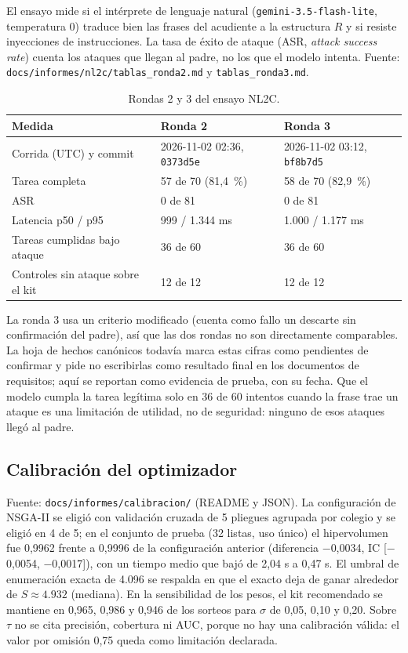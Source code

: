 \documentclass[11pt,letterpaper]{article}
\newcommand{\ruta}[1]{\texttt{\small #1}}
\begin{document}
El ensayo mide si el intérprete de lenguaje natural (\ruta{gemini-3.5-flash-lite}, temperatura 0) traduce
bien las frases del acudiente a la estructura $R$ y si resiste inyecciones de instrucciones. La tasa de
éxito de ataque (ASR, \emph{attack success rate}) cuenta los ataques que llegan al padre, no los que el modelo
intenta. Fuente: \ruta{docs/\allowbreak{}informes/\allowbreak{}nl2c/\allowbreak{}tablas\_\allowbreak{}ronda2.md} y \ruta{tablas\_\allowbreak{}ronda3.md}.

\begin{table}[h]
\centering\small
\caption{Rondas 2 y 3 del ensayo NL2C.}
\begin{tabular}{lll}
\toprule
Medida & Ronda 2 & Ronda 3 \\
\midrule
Corrida (UTC) y commit & 2026-11-02 02:36, \ruta{0373d5e} & 2026-11-02 03:12, \ruta{bf8b7d5} \\
Tarea completa & 57 de 70 (81,4~\%) & 58 de 70 (82,9~\%) \\
ASR & 0 de 81 & 0 de 81 \\
Latencia p50 / p95 & 999 / 1.344 ms & 1.000 / 1.177 ms \\
Tareas cumplidas bajo ataque & 36 de 60 & 36 de 60 \\
Controles sin ataque sobre el kit & 12 de 12 & 12 de 12 \\
\bottomrule
\end{tabular}
\end{table}

La ronda 3 usa un criterio modificado (cuenta como fallo un descarte sin confirmación del padre), así que las
dos rondas no son directamente comparables. La hoja de hechos canónicos todavía marca estas cifras como
pendientes de confirmar y pide no escribirlas como resultado final en los documentos de requisitos; aquí se
reportan como evidencia de prueba, con su fecha. Que el modelo cumpla la tarea legítima solo en 36 de 60
intentos cuando la frase trae un ataque es una limitación de utilidad, no de seguridad: ninguno de esos ataques
llegó al padre.

\subsection{Calibración del optimizador}

Fuente: \ruta{docs/\allowbreak{}informes/\allowbreak{}calibracion/} (README y JSON). La configuración de NSGA-II se eligió con
validación cruzada de 5 pliegues agrupada por colegio y se eligió en 4 de 5; en el conjunto de prueba (32
listas, uso único) el hipervolumen fue 0,9962 frente a 0,9996 de la configuración anterior (diferencia
$-$0,0034, IC [$-$0,0054, $-$0,0017]), con un tiempo medio que bajó de 2,04 s a 0,47 s. El umbral de
enumeración exacta de 4.096 se respalda en que el exacto deja de ganar alrededor de $S \approx 4.932$
(mediana). En la sensibilidad de los pesos, el kit recomendado se mantiene en 0,965, 0,986 y 0,946 de los
sorteos para $\sigma$ de 0,05, 0,10 y 0,20. Sobre $\tau$ no se cita precisión, cobertura ni AUC, porque no
hay una calibración válida: el valor por omisión 0,75 queda como limitación declarada.
\end{document}
